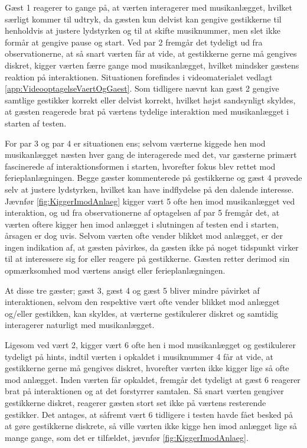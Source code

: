 Gæst 1 reagerer to gange på, at værten interagerer med musikanlægget, hvilket særligt kommer til udtryk, da gæsten kun delvist kan gengive gestikkerne til henholdvis at justere lydstyrken og til at skifte musiknummer, men slet ikke formår at gengive pause og start. Ved par 2 fremgår det tydeligt ud fra observationerne, at så snart værten får at vide, at gestikkerne gerne må gengives diskret, kigger værten færre gange mod musikanlægget, hvilket mindsker gæstens reaktion på interaktionen. Situationen forefindes i videomaterialet vedlagt \autoref{app:VideooptagelseVaertOgGaest}. Som tidligere nævnt kan gæst 2 gengive samtlige gestikker korrekt eller delvist korrekt, hvilket højst sandsynligt skyldes, at gæsten reagerede brat på værtens tydelige interaktion med musikanlægget i starten af testen. 

For par 3 og par 4 er situationen ens; selvom værterne kiggede hen mod musikanlægget næsten hver gang de interagerede med det, var gæsterne primært fascinerede af interaktionsformen i starten, hvorefter fokus blev rettet mod ferieplanlægningen. Begge gæster kommenterede på gestikkerne og gæst 4 prøvede selv at justere lydstyrken, hvilket kan have indflydelse på den dalende interesse. Jævnfør \autoref{fig:KiggerImodAnlaeg} kigger vært 5 ofte hen imod musikanlægget ved interaktion, og ud fra observationerne af optagelsen af par 5 fremgår det, at værten oftere kigger hen imod anlægget i slutningen af testen end i starten, årsagen er dog uvis. Selvom værten ofte vender blikket mod anlægget, er der ingen indikation af, at gæsten påvirkes, da gæsten ikke på noget tidspunkt virker til at interessere sig for eller reagere på gestikkerne. Gæsten retter derimod sin opmærksomhed mod værtens ansigt eller ferieplanlægningen. 

At disse tre gæster; gæst 3, gæst 4 og gæst 5 bliver mindre påvirket af interaktionen, selvom den respektive vært ofte vender blikket mod anlægget og/eller gestikken, kan skyldes, at værterne gestikulerer diskret og samtidig interagerer naturligt med musikanlægget.

Ligesom ved vært 2, kigger vært 6 ofte hen i mod musikanlægget og gestikulerer tydeligt på hints, indtil værten i opkaldet i musiknummer 4 får at vide, at gestikkerne gerne må gengives diskret, hvorefter værten ikke kigger lige så ofte mod anlægget. Inden værten får opkaldet, fremgår det tydeligt at gæst 6 reagerer brat på interaktionen og at det forstyrrer samtalen. Så snart værten gengiver gestikkerne diskret, reagerer gæsten stort set ikke på værtens resterende gestikker. Det antages, at såfremt vært 6 tidligere i testen havde fået besked på at gøre gestikkerne diskrete, så ville værten ikke kigge hen imod anlægget lige så mange gange, som det er tilfældet, jævnfør \autoref{fig:KiggerImodAnlaeg}. 

